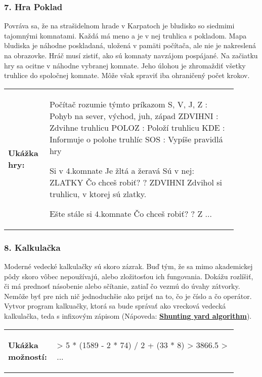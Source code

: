 \subsubsection*{7. Hra Poklad}
Povráva sa, že na strašidelnom hrade v Karpatoch je bludisko so siedmimi tajomnými komnatami. Každá má meno a je v nej truhlica s pokladom. Mapa bludiska je náhodne poskladaná, uložená v pamäti počítača, ale nie je nakreslená na obrazovke. Hráč musí zistiť, ako sú komnaty navzájom pospájané. Na začiatku hry sa ocitne v náhodne vybranej komnate. Jeho úlohou je zhromaždiť všetky truhlice do spoločnej komnate. Môže však spraviť iba ohraničený počet krokov.

\begin{tabular}{@{}p{0.15\linewidth}p{0.75\linewidth}}
\textbf{\small Ukážka hry:} &
\vspace{-3em}
\begin{code}
Počítač rozumie týmto príkazom
S, V, J, Z   : Pohyb na sever, východ, juh, západ
ZDVIHNI		 : Zdvihne truhlicu
POLOZ		 : Položí truhlicu
KDE			 : Informuje o polohe truhlíc
SOS			 : Vypíše pravidlá hry

Si v 4.komnate
Je žltá a žeravá
Sú v nej: ZLATKY
Čo chceš robiť?
? ZDVIHNI
Zdvihol si truhlicu, v ktorej sú zlatky.

Ešte stále si 4.komnate
Čo chceš robiť?
? Z
...
\end{code}
\end{tabular}
\vspace{-2em}

\subsubsection*{8. Kalkulačka}
Moderné vedecké kalkulačky sú skoro zázrak. Buď tým, že sa mimo akademickej pôdy skoro vôbec nepoužívajú, alebo zložitosťou ich fungovania. Dokážu rozlíšiť, či má prednosť násobenie alebo sčítanie, zatiaľ čo vezmú do úvahy zátvorky. Nemôže byť pre nich nič jednoduchšie ako prijsť na to, čo je číslo a čo operátor. Vytvor program kalkuačky, ktorá sa bude správať ako vrecková vedecká kalkulačka, teda s infixovým zápisom (Nápoveda: \underline{\textbf{Shunting yard algorithm}}).

\begin{tabular}{@{}p{0.15\linewidth}p{0.75\linewidth}}
\textbf{\small Ukážka možností:} &
\vspace{-3em}
\begin{code}
> 5 * (1589 - 2 * 74) / 2 + (33 * 8)
> 3866.5
> ...
\end{code}
\end{tabular}
\vspace{-2em}
